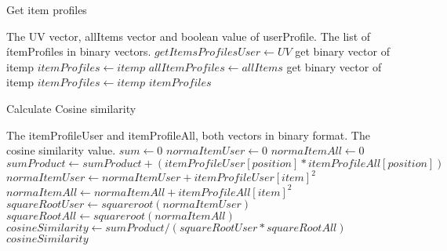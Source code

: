 \begin{algorithm}
\small
\caption{Get item profiles}
\begin{algorithmic} 
\REQUIRE The UV vector, allItems vector and boolean value of userProfile.
\ENSURE The list of ítemProfiles in binary vectors. 
\STATE $getItemsProfilesUser \leftarrow UV$
\STATE get binary vector of itemp
\STATE $itemProfiles \leftarrow itemp$
\ENDFOR
\ELSE
\STATE $allItemProfiles \leftarrow allItems$
\STATE get binary vector of itemp
\STATE $itemProfiles \leftarrow itemp$
\ENDFOR
\ENDIF
\RETURN $itemProfiles$
\end{algorithmic}
\end{algorithm}
\begin{algorithm}
\small
\caption{Calculate Cosine similarity}
\begin{algorithmic} 
\REQUIRE The itemProfileUser and itemProfileAll, both vectors in binary format.
\ENSURE The cosine similarity value.
\STATE $sum \leftarrow 0$
\STATE $normaItemUser \leftarrow 0$
\STATE $normaItemAll \leftarrow 0$
\STATE $sumProduct \leftarrow sumProduct+(itemProfileUser[position]*itemProfileAll[position])$
\ENDFOR
{}
\STATE $normaItemUser \leftarrow normaItemUser + itemProfileUser[item]^2$
\ENDFOR
{}
\STATE $normaItemAll \leftarrow normaItemAll+itemProfileAll[item]^2$
\ENDFOR
\STATE $squareRootUser \leftarrow squareroot(normaItemUser)$
\STATE $squareRootAll   \leftarrow squareroot(normaItemAll)$
\STATE $cosineSimilarity \leftarrow sumProduct/(squareRootUser*squareRootAll)$
\RETURN $cosineSimilarity$
\end{algorithmic}
\end{algorithm}
